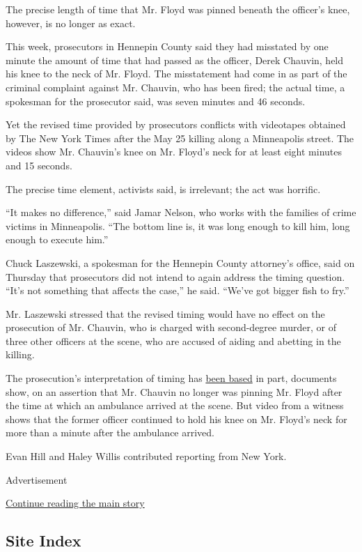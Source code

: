 The precise length of time that Mr. Floyd was pinned beneath the
officer's knee, however, is no longer as exact.

This week, prosecutors in Hennepin County said they had misstated by one
minute the amount of time that had passed as the officer, Derek Chauvin,
held his knee to the neck of Mr. Floyd. The misstatement had come in as
part of the criminal complaint against Mr. Chauvin, who has been fired;
the actual time, a spokesman for the prosecutor said, was seven minutes
and 46 seconds.

Yet the revised time provided by prosecutors conflicts with videotapes
obtained by The New York Times after the May 25 killing along a
Minneapolis street. The videos show Mr. Chauvin's knee on Mr. Floyd's
neck for at least eight minutes and 15 seconds.

The precise time element, activists said, is irrelevant; the act was
horrific.

``It makes no difference,'' said Jamar Nelson, who works with the
families of crime victims in Minneapolis. ``The bottom line is, it was
long enough to kill him, long enough to execute him.''

Chuck Laszewski, a spokesman for the Hennepin County attorney's office,
said on Thursday that prosecutors did not intend to again address the
timing question. ``It's not something that affects the case,'' he said.
``We've got bigger fish to fry.''

Mr. Laszewski stressed that the revised timing would have no effect on
the prosecution of Mr. Chauvin, who is charged with second-degree
murder, or of three other officers at the scene, who are accused of
aiding and abetting in the killing.

The prosecution's interpretation of timing has
\href{http://mncourts.gov/mncourtsgov/media/High-Profile-Cases/27-CR-20-12646/AmendedComplaint06032020.pdf}{been
based} in part, documents show, on an assertion that Mr. Chauvin no
longer was pinning Mr. Floyd after the time at which an ambulance
arrived at the scene. But video from a witness shows that the former
officer continued to hold his knee on Mr. Floyd's neck for more than a
minute after the ambulance arrived.

Evan Hill and Haley Willis contributed reporting from New York.

Advertisement

\protect\hyperlink{after-bottom}{Continue reading the main story}

\hypertarget{site-index}{%
\subsection{Site Index}\label{site-index}}


